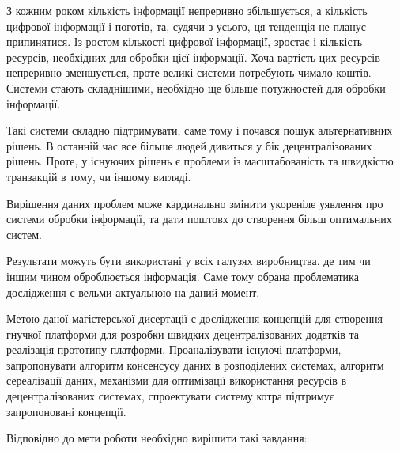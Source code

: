 \documentclass{lib/styles/default-style}
\begin{document}
\pagestyle{default-numbered}

\tableofcontents

\newpage


    З кожним роком кількість інформації непреривно збільшується, а кількість цифрової інформації і поготів,
    та, судячи з усього, ця тенденція не планує припинятися. Із ростом кількості цифрової інформації, зростає і
    кількість ресурсів, необхідних для обробки цієї інформації. Хоча вартість цих ресурсів непреривно зменшується,
    проте великі системи потребують чимало коштів. Системи стають складнішими, необхідно ще більше потужностей для обробки інформації.

    Такі системи складно підтримувати, саме тому і почався пошук альтернативних рішень. В останній час все більше людей дивиться у бік
    децентралізованих рішень. Проте, у існуючих рішень є проблеми із масштабованість та швидкістю транзакцій в тому, чи іншому вигляді.

    Вирішення даних проблем може кардинально змінити укореніле уявлення про системи обробки інформації, та дати поштовх до створення
    більш оптимальних систем.

    Результати можуть бути використані у всіх галузях виробництва, де тим чи іншим чином оброблюється інформація.
    Саме тому обрана проблематика дослідження є вельми актуальною на даний момент.

    Метою даної магістерської дисертації є дослідження концепцій для створення гнучкої платформи для розробки швидких децентралізованих додатків
    та реалізація прототипу платформи. Проаналізувати існуючі платформи, запропонувати алгоритм консенсусу  даних  в  розподілених  системах,
    алгоритм сереалізації даних, механізми для оптимізації використання ресурсів в децентралізованих системах,
    спроектувати  систему  котра  підтримує запропоновані концепції.

    Відповідно до мети роботи необхідно вирішити такі завдання:
\end{document}
